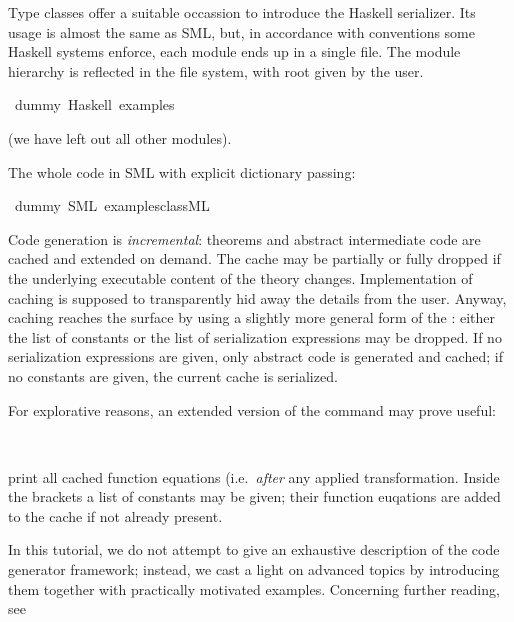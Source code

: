 \begin{isabellebody}
\begin{isamarkuptext}
Type classes offer a suitable occassion to introduce
  the Haskell serializer.  Its usage is almost the same
  as SML, but, in accordance with conventions
  some Haskell systems enforce, each module ends
  up in a single file. The module hierarchy is reflected in
  the file system, with root given by the user.%
\end{isamarkuptext}%
\isamarkuptrue%
\isamarkupfalse%
\ dummy\ {\isacharparenleft}Haskell\ {\isachardoublequoteopen}examples{\isacharslash}{\isachardoublequoteclose}{\isacharparenright}%
\begin{isamarkuptext}%

  (we have left out all other modules).

  The whole code in SML with explicit dictionary passing:%
\end{isamarkuptext}%
\isamarkuptrue%
\isamarkupfalse%
\ dummy\ {\isacharparenleft}SML\ {\isachardoublequoteopen}examples{\isacharslash}class{\isachardot}ML{\isachardoublequoteclose}{\isacharparenright}%
\begin{isamarkuptext}%
%
\end{isamarkuptext}%
\isamarkuptrue%
%
\isamarkuptrue%
%
\begin{isamarkuptext}%
Code generation is \emph{incremental}: theorems
  and abstract intermediate code are cached and extended on demand.
  The cache may be partially or fully dropped if the underlying
  executable content of the theory changes.
  Implementation of caching is supposed to transparently
  hid away the details from the user.  Anyway, caching
  reaches the surface by using a slightly more general form
  of the \isasymCODEGEN: either the list of constants or the
  list of serialization expressions may be dropped.  If no
  serialization expressions are given, only abstract code
  is generated and cached; if no constants are given, the
  current cache is serialized.

  For explorative reasons, an extended version of the
  \isasymCODEGEN command may prove useful:%
\end{isamarkuptext}%
\isamarkuptrue%
\isamarkupfalse%
\ {\isacharparenleft}{\isacharparenright}%
\begin{isamarkuptext}%
\noindent print all cached function equations (i.e.~\emph{after}
  any applied transformation. Inside the brackets a
  list of constants may be given; their function
  euqations are added to the cache if not already present.%
\end{isamarkuptext}%
\isamarkuptrue%
%
\isamarkuptrue%
%
\begin{isamarkuptext}%
In this tutorial, we do not attempt to give an exhaustive
  description of the code generator framework; instead,
  we cast a light on advanced topics by introducing
  them together with practically motivated examples.  Concerning
  further reading, see


\end{isamarkuptext}
\end{isabellebody}
